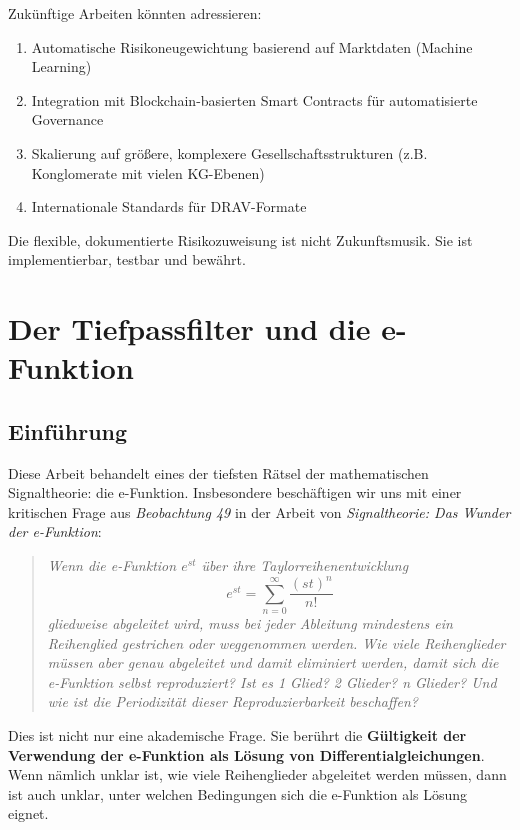 \documentclass[a4paper, 12pt, twoside, openright]{report}
\theoremstyle{definition}
\theoremstyle{definition}
\begin{document}
Zukünftige Arbeiten könnten adressieren:
\begin{enumerate}
    \item Automatische Risikoneugewichtung basierend auf Marktdaten (Machine Learning)
    \item Integration mit Blockchain-basierten Smart Contracts für automatisierte Governance
    \item Skalierung auf größere, komplexere Gesellschaftsstrukturen (z.B. Konglomerate mit vielen KG-Ebenen)
    \item Internationale Standards für DRAV-Formate
\end{enumerate}

Die flexible, dokumentierte Risikozuweisung ist nicht Zukunftsmusik. Sie ist implementierbar, testbar und bewährt.

\cleardoublepage


\chapter{Der Tiefpassfilter und die e-Funktion}
\label{ch:e-function}

\section{Einführung}
Diese Arbeit behandelt eines der tiefsten Rätsel der mathematischen Signaltheorie: die e-Funktion. Insbesondere beschäftigen wir uns mit einer kritischen Frage aus \textit{Beobachtung 49} in der Arbeit von \cite{epp_signal} \textit{Signaltheorie: Das Wunder der e-Funktion}:

\begin{quote}
	\textit{Wenn die e-Funktion $e^{st}$ über ihre Taylorreihenentwicklung 
	$$e^{st} = \sum_{n=0}^{\infty} \frac{(st)^n}{n!}$$
	gliedweise abgeleitet wird, muss bei jeder Ableitung mindestens ein Reihenglied gestrichen oder weggenommen werden. Wie viele Reihenglieder müssen aber genau abgeleitet und damit eliminiert werden, damit sich die e-Funktion selbst reproduziert? Ist es 1 Glied? 2 Glieder? n Glieder? Und wie ist die Periodizität dieser Reproduzierbarkeit beschaffen?}
\end{quote}

Dies ist nicht nur eine akademische Frage. Sie berührt die \textbf{Gültigkeit der Verwendung der e-Funktion als Lösung von Differentialgleichungen}. Wenn nämlich unklar ist, wie viele Reihenglieder abgeleitet werden müssen, dann ist auch unklar, unter welchen Bedingungen sich die e-Funktion als Lösung eignet.
\end{document}

